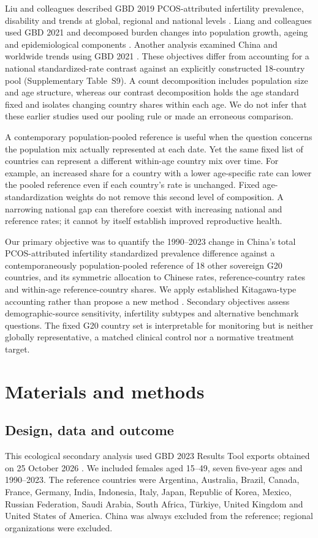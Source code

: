 \documentclass[11pt,a4paper]{article}
\begin{document}
Liu and colleagues described GBD 2019 PCOS-attributed infertility prevalence, disability and trends at global, regional and national levels \citep{liu_pcos2024}. Liang and colleagues used GBD 2021 and decomposed burden changes into population growth, ageing and epidemiological components \citep{liang_burden2025}. Another analysis examined China and worldwide trends using GBD 2021 \citep{liang_trend2026}. These objectives differ from accounting for a national standardized-rate contrast against an explicitly constructed 18-country pool (Supplementary Table~S9). A count decomposition includes population size and age structure, whereas our contrast decomposition holds the age standard fixed and isolates changing country shares within each age. We do not infer that these earlier studies used our pooling rule or made an erroneous comparison.

A contemporary population-pooled reference is useful when the question concerns the population mix actually represented at each date. Yet the same fixed list of countries can represent a different within-age country mix over time. For example, an increased share for a country with a lower age-specific rate can lower the pooled reference even if each country's rate is unchanged. Fixed age-standardization weights do not remove this second level of composition. A narrowing national gap can therefore coexist with increasing national and reference rates; it cannot by itself establish improved reproductive health.

Our primary objective was to quantify the 1990--2023 change in China's total PCOS-attributed infertility standardized prevalence difference against a contemporaneously population-pooled reference of 18 other sovereign G20 countries, and its symmetric allocation to Chinese rates, reference-country rates and within-age reference-country shares. We apply established Kitagawa-type accounting rather than propose a new method \citep{kitagawa}. Secondary objectives assess demographic-source sensitivity, infertility subtypes and alternative benchmark questions. The fixed G20 country set is interpretable for monitoring but is neither globally representative, a matched clinical control nor a normative treatment target.

\section{Materials and methods}
\subsection{Design, data and outcome}
This ecological secondary analysis used GBD 2023 Results Tool exports obtained on 25 October 2026 \citep{results}. We included females aged 15--49, seven five-year ages and 1990--2023. The reference countries were Argentina, Australia, Brazil, Canada, France, Germany, India, Indonesia, Italy, Japan, Republic of Korea, Mexico, Russian Federation, Saudi Arabia, South Africa, T\"urkiye, United Kingdom and United States of America. China was always excluded from the reference; regional organizations were excluded.
\end{document}
